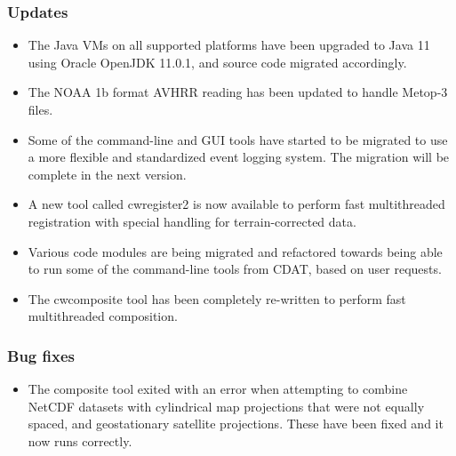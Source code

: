 \subsubsection*{ Updates}

\begin{itemize}

  \item The Java VMs on all supported platforms have been upgraded to Java 11
  using Oracle OpenJDK 11.0.1, and source code migrated accordingly.

  \item The NOAA 1b format AVHRR reading has been updated to handle Metop-3
  files.

  \item Some of the command-line and GUI tools have started to be migrated to
  use a more flexible and standardized event logging system.  The migration
  will be complete in the next version.

  \item A new tool called cwregister2 is now available to perform fast
  multithreaded registration with special handling for terrain-corrected data.

  \item Various code modules are being migrated and refactored towards
  being able to run some of the command-line tools from CDAT, based on
  user requests.

  \item The cwcomposite tool has been completely re-written to perform fast
  multithreaded composition.

\end{itemize}

\subsubsection*{ Bug fixes}
\begin{itemize}

  \item The composite tool exited with an error when attempting to combine
  NetCDF datasets with cylindrical map projections that were not equally
  spaced, and geostationary satellite projections.  These have been fixed and
  it now runs correctly.

\end{itemize}


